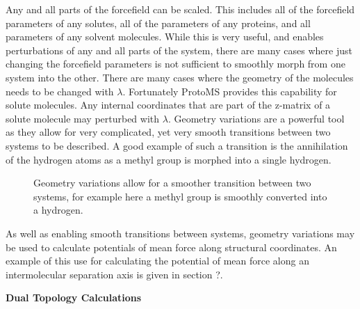 \documentclass[letterpaper,10pt,english]{sphinxmanual}
\begin{document}
Any and all parts of the forcefield can be scaled. This includes all of the forcefield parameters of any solutes, all of the parameters of any proteins, and all parameters of any solvent molecules. While this is very useful, and enables perturbations of any and all parts of the system, there are many cases where just changing the forcefield parameters is not sufficient to smoothly morph from one system into the other. There are many cases where the geometry of the molecules needs to be changed with \(\lambda\). Fortunately ProtoMS provides this capability for solute molecules. Any internal coordinates that are part of the z-matrix of a solute molecule may perturbed with \(\lambda\). Geometry variations are a powerful tool as they allow for very complicated, yet very smooth transitions between two systems to be described. A good example of such a transition is the annihilation of the hydrogen atoms as a methyl group is morphed into a single hydrogen.
\begin{figure}[htbp]
\centering
\capstart

\caption{Geometry variations allow for a smoother transition between two systems, for example here a methyl group is smoothly converted into a hydrogen.}\end{figure}

As well as enabling smooth transitions between systems, geometry variations may be used to calculate potentials of mean force along structural coordinates. An example of this use for calculating the potential of mean force along an intermolecular separation axis is given in section ?.

\textbf{Dual Topology Calculations}
\end{document}
